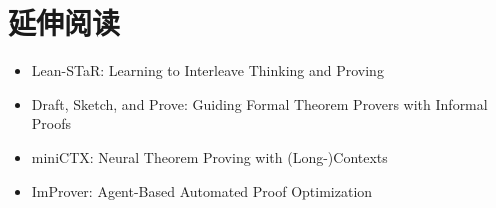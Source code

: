 \documentclass[a4paper]{article}
\begin{document}
\section{延伸阅读}
\begin{itemize}
\item Lean-STaR: Learning to Interleave Thinking and Proving
\item Draft, Sketch, and Prove: Guiding Formal Theorem Provers with Informal Proofs
\item miniCTX: Neural Theorem Proving with (Long-)Contexts
\item ImProver: Agent-Based Automated Proof Optimization
\end{itemize}
\end{document}
